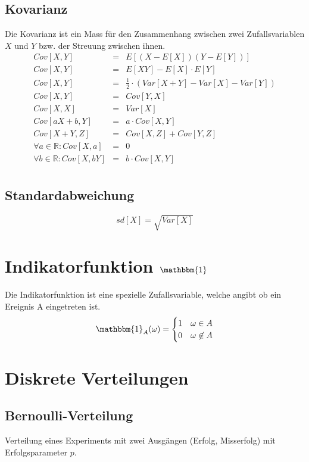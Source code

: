 \documentclass[10pt,a4paper,twocolumn]{article}
\begin{document}
\subsection{Kovarianz}
Die Kovarianz ist ein Mass für den Zusammenhang zwischen zwei Zufallsvariablen $X$ und $Y$ bzw. der Streuung zwischen ihnen.
\[
\begin{array}{rcl}
	Cov[X,Y] & = & E[(X - E[X])(Y - E[Y])] \\
	Cov[X,Y] & = & E[XY] - E[X] \cdot E[Y] \\
	Cov[X,Y] & = & \frac{1}{2} \cdot \left(Var[X + Y] - Var[X] - Var[Y] \right)	\\
	Cov[X,Y] &= & Cov[Y,X] \\
	Cov[X,X] & = & Var[X] \\
	Cov[aX + b,Y] & = & a \cdot Cov[X,Y] \\
	Cov[X + Y,Z] & = & Cov[X,Z] + Cov[Y,Z] \\
	\forall a \in \mathbb{R}: Cov[X,a] & = & 0 \\
	\forall b \in \mathbb{R}: Cov[X,bY] & = & b \cdot Cov[X,Y] \\
\end{array}
\]

\subsection{Standardabweichung}
\[
sd[X] = \sqrt{Var[X]}
\]

\section{Indikatorfunktion $\mathbbm{1}$}
Die Indikatorfunktion ist eine spezielle Zufallsvariable, welche angibt ob ein Ereignis A eingetreten ist.
\begin{equation}
	\mathbbm{1}_A(\omega) = \begin{cases}
			1 & \omega \in A\\
			0 & \omega \not\in A
		\end{cases}
\end{equation}


\section{Diskrete Verteilungen}

\subsection{Bernoulli-Verteilung}
Verteilung eines Experiments mit zwei Ausgängen (Erfolg, Misserfolg) mit Erfolgsparameter $p$.
\end{document}
